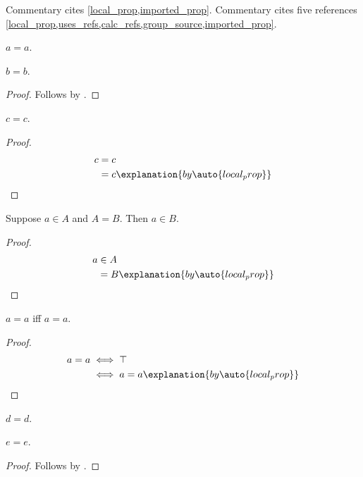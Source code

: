 

Commentary cites \cref{local_prop,imported_prop}.
Commentary cites five references \cref{local_prop,uses_refs,calc_refs,group_source,imported_prop}.

\begin{proposition}\label{local_prop}
    $a = a$.
\end{proposition}

\begin{proposition}\label{uses_refs}
    $b = b$.
\end{proposition}
\begin{proof}
    Follows by .
\end{proof}

\begin{proposition}\label{calc_refs}
    $c = c$.
\end{proposition}
\begin{proof}
    \begin{align*}
        c
            &= c
                \\
            &= c
                \explanation{by \auto{local_prop}}
    \end{align*}
\end{proof}

\begin{proposition}\label{relation_calc_rows}
    Suppose $a\in A$ and $A=B$.
    Then $a\in B$.
\end{proposition}
\begin{proof}
    \begin{align*}
        a
            &\in A
                \\
            &= B
                \explanation{by \auto{local_prop}}
    \end{align*}
\end{proof}

\begin{proposition}\label{biconditional_calc_rows}
    $a=a$ iff $a=a$.
\end{proposition}
\begin{proof}
    \begin{align*}
        a=a
            &\iff \top
                \\
            &\iff a=a
                \explanation{by \auto{local_prop}}
    \end{align*}
\end{proof}

\begin{proposition}\label{group_source}
    $d = d$.
\end{proposition}

\begin{proposition}\label{many_refs}
    $e = e$.
\end{proposition}
\begin{proof}
    Follows by .
\end{proof}
